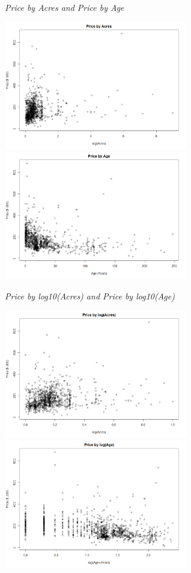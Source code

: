 \documentclass[10pt,A4,makeidx]{article}
\begin{document}
  \emph{Price by Acres and Price by Age}\\
  \begin{center}
    \includegraphics[width=8cm]{price-acres.png}
    \includegraphics[width=8cm]{price-age.png}
  \end{center}
  
  \emph{Price by log10(Acres) and Price by log10(Age)}\\
  \begin{center}
    \includegraphics[width=8cm]{price-logacres.png}
    \includegraphics[width=8cm]{price-logage.png}
  \end{center}
  
\end{document}
